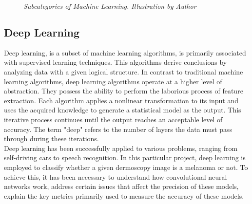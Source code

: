 \begin{figure}[H]
\centering
{}
\caption[Subcategories of Machine Learning.]{\textit{Subcategories of Machine Learning. Illustration by Author}}
{\label{fig:ml_branches}}
\end{figure}


\subsection{Deep Learning}

Deep learning, is a subset of machine learning algorithms, is primarily associated with supervised learning techniques. This algorithms derive conclusions by analyzing data with a given logical structure. In contrast to traditional machine learning algorithms, deep learning algorithms operate at a higher level of abstraction. They possess the ability to perform the laborious process of feature extraction. Each algorithm applies a nonlinear transformation to its input and uses the acquired knowledge to generate a statistical model as the output. This iterative process continues until the output reaches an acceptable level of accuracy. The term "deep" refers to the number of layers the data must pass through during these iterations. \\

Deep learning has been successfully applied to various problems, ranging from self-driving cars to speech recognition. In this particular project, deep learning is employed to classify whether a given dermoscopy image is a melanoma or not. To achieve this, it has been necessary to understand how convolutional neural networks work, address certain issues that affect the precision of these models, explain the key metrics primarily used to measure the accuracy of these models.


